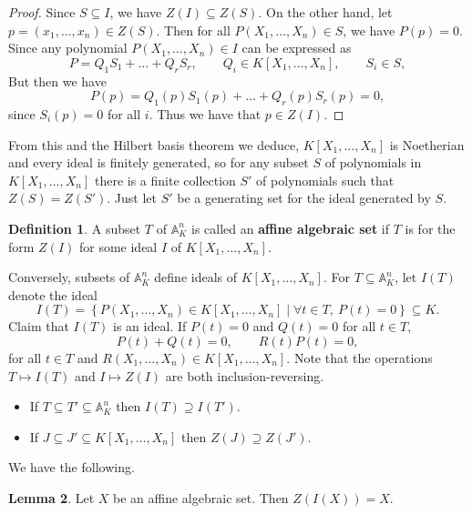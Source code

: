 \documentclass{article}
\newcommand{\A}{\mathbb{A}}
\newcommand{\rb}[1]{\left( #1 \right)}
\renewcommand{\sb}[1]{\left[ #1 \right]}
\newcommand{\cb}[1]{\left\{ #1 \right\}}
\theoremstyle{definition}\newtheorem{definition}{Definition}[subsection]
\theoremstyle{definition}\newtheorem{remark}[definition]{Remark}
\theoremstyle{definition}\newtheorem*{example}{Example}
\theoremstyle{definition}\newtheorem*{note}{Note}
\newtheorem{lemma}[definition]{Lemma}
\begin{document}
\begin{proof}
Since $ S \subseteq I $, we have $ Z\rb{I} \subseteq Z\rb{S} $. On the other hand, let $ p = \rb{x_1, \dots, x_n} \in Z\rb{S} $. Then for all $ P\rb{X_1, \dots, X_n} \in S $, we have $ P\rb{p} = 0 $. Since any polynomial $ P\rb{X_1, \dots, X_n} \in I $ can be expressed as
$$ P = Q_1S_1 + \dots + Q_rS_r, \qquad Q_i \in K\sb{X_1, \dots, X_n}, \qquad S_i \in S, $$
But then we have
$$ P\rb{p} = Q_1\rb{p}S_1\rb{p} + \dots + Q_r\rb{p}S_r\rb{p} = 0, $$
since $ S_i\rb{p} = 0 $ for all $ i $. Thus we have that $ p \in Z\rb{I} $.
\end{proof}

From this and the Hilbert basis theorem we deduce, $ K\sb{X_1, \dots, X_n} $ is Noetherian and every ideal is finitely generated, so for any subset $ S $ of polynomials in $ K\sb{X_1, \dots, X_n} $ there is a finite collection $ S' $ of polynomials such that $ Z\rb{S} = Z\rb{S'} $. Just let $ S' $ be a generating set for the ideal generated by $ S $.

\begin{definition}
A subset $ T $ of $ \A_K^n $ is called an \textbf{affine algebraic set} if $ T $ is for the form $ Z\rb{I} $ for some ideal $ I $ of $ K\sb{X_1, \dots, X_n} $.
\end{definition}

Conversely, subsets of $ \A_K^n $ define ideals of $ K\sb{X_1, \dots, X_n} $. For $ T \subseteq \A_K^n $, let $ I\rb{T} $ denote the ideal
$$ I\rb{T} = \cb{P\rb{X_1, \dots, X_n} \in K\sb{X_1, \dots, X_n} \mid \forall t \in T, \ P\rb{t} = 0} \subseteq K. $$
Claim that $ I\rb{T} $ is an ideal. If $ P\rb{t} = 0 $ and $ Q\rb{t} = 0 $ for all $ t \in T $,
$$ P\rb{t} + Q\rb{t} = 0, \qquad R\rb{t}P\rb{t} = 0, $$
for all $ t \in T $ and $ R\rb{X_1, \dots, X_n} \in K\sb{X_1, \dots, X_n} $. Note that the operations $ T \mapsto I\rb{T} $ and $ I \mapsto Z\rb{I} $ are both inclusion-reversing.
\begin{itemize}
\item If $ T \subseteq T' \subseteq \A_K^n $ then $ I\rb{T} \supseteq I\rb{T'} $.
\item If $ J \subseteq J' \subseteq K\sb{X_1, \dots, X_n} $ then $ Z\rb{J} \supseteq Z\rb{J'} $.
\end{itemize}
We have the following.

\begin{lemma}
Let $ X $ be an affine algebraic set. Then $ Z\rb{I\rb{X}} = X $.
\end{lemma}
\end{document}
